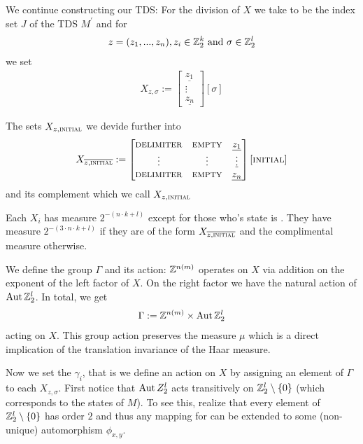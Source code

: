 We continue constructing our TDS:
For the division of $X$ we take  to be the index set $J$ of the TDS $M^\prime$ and for
\begin{align*}
	z = (z_1,...,z_n), z_i \in \mathbb{Z}_2^k ~\text{and}~\sigma \in \mathbb{Z}_2^l
\end{align*}
we set
\begin{align*}
	X_{z,\sigma} :=
	\begin{bmatrix}
		\underline{z_{1}} \\
		\vdots \\
		\underline{z_{n}}
	\end{bmatrix} [ \sigma ]
\end{align*}

The sets $X_{z,\text{\scshape{initial}}}$ we devide further into
\begin{align*}
	X_{\overline{z,\text{\scshape{initial}}}} :=
	\begin{bmatrix}
		\text{\scshape{delimiter}} & \text{\scshape{empty}} & \underline{z_1} \\
		\vdots & \vdots & \underline\vdots \\
		\text{\scshape{delimiter}} & \text{\scshape{empty}} & \underline{z_n} \\
	\end{bmatrix} [ \text{\scshape{initial}} ]
\end{align*}
and its complement which we call $X_{z,\text{\scshape{initial}}}$

\begin{Remark}
	Each $X_i$ has measure $2^{-(n \cdot k+l)}$ except for those who's state is \INI.
	They have measure $2^{-(3 \cdot n \cdot k+l)}$ if they are of the form $X_{\overline{z,\text{\scshape{initial}}}}$ and the complimental measure otherwise.
\end{Remark}

We define the group $\Gamma$ and its action:
$\mathbb{Z}^{n(m)}$ operates on $X$ via addition on the exponent of the left factor of $X$.
On the right factor we have the natural action of $\operatorname{Aut} \mathbb{Z}_2^l$.
In total, we get
\begin{align*}
	\Gamma := \mathbb{Z}^{n(m)} \times \operatorname{Aut} \mathbb{Z}_2^l
\end{align*}
acting on $X$.
This group action preserves the measure $\mu$ which is a direct implication of the translation invariance of the Haar measure.

Now we set the $\gamma_i$, that is we define an action on $X$ by assigning an element of $\Gamma$ to each $X_{z,\sigma}$.
First notice that
$\operatorname{Aut} Z_2^l$ acts transitively on $\mathbb{Z}_2^l \setminus \{0\}$ (which corresponds to the states of $M$).
To see this, realize that every element of $\mathbb{Z}_2^l \setminus \{0\}$ has order $2$ and thus any mapping  for  can be extended to some (non-unique) automorphism $\phi_{x,y}$.

